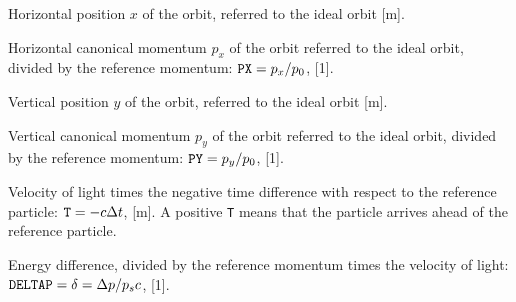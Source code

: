 \begin{mylist}
Horizontal position \(x\) of the orbit, referred to the ideal orbit [m].
 
Horizontal canonical momentum \(p_{x}\) of the orbit
referred to the ideal orbit, divided by the reference momentum:
\(\hbox{\tt PX}=p_{x}/p_{0}\), [1].
 
Vertical position \(y\) of the orbit, referred to the ideal orbit [m].
 
Vertical canonical momentum \(p_{y}\) of the orbit
referred to the ideal orbit, divided by the reference momentum:
\(\hbox{\tt PY}=p_{y}/p_{0}\), [1].
 
Velocity of light times the negative time difference
with respect to the reference particle:
\(\hbox{\tt T}=-c\Delta t\), [m].
A positive {\tt T} means that the particle arrives ahead
of the reference particle.
 
Energy difference,
divided by the reference momentum times the velocity of light:
\(\hbox{\tt DELTAP}=\delta =\Delta p/p_sc\), [1].
\end{mylist}
 
